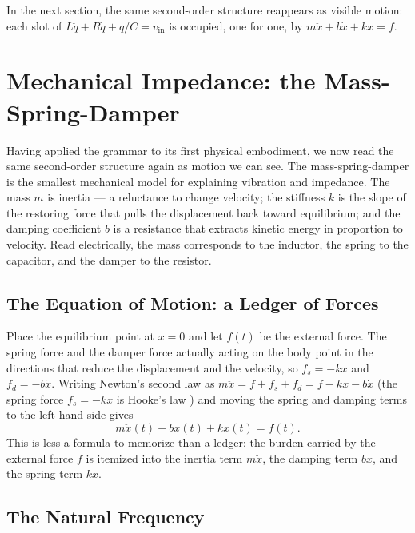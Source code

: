 In the next section, the same second-order structure reappears as visible
motion: each slot of
$L\ddot{q} + R\dot{q} + q/C = v_{\mathrm{in}}$
is occupied, one for one, by
$m\ddot{x} + b\dot{x} + kx = f$.

\section{Mechanical Impedance: the Mass-Spring-Damper}
\label{sec:u5-mechanical}

Having applied the grammar to its first physical embodiment, we now read
the same second-order structure again as motion we can see.
The mass-spring-damper is the smallest mechanical model for explaining
vibration and impedance.
The mass $m$ is inertia --- a reluctance to change velocity; the stiffness
$k$ is the slope of the restoring force that pulls the displacement back
toward equilibrium; and the damping coefficient $b$ is a resistance that
extracts kinetic energy in proportion to velocity.
Read electrically, the mass corresponds to the inductor, the spring to the
capacitor, and the damper to the resistor.

\subsection{The Equation of Motion: a Ledger of Forces}

Place the equilibrium point at $x=0$ and let $f(t)$ be the external force.
The spring force and the damper force actually acting on the body point in
the directions that reduce the displacement and the velocity, so
$f_s=-kx$ and $f_d=-b\dot{x}$.
Writing Newton's second law \cite{newton1687principia} as
$m\ddot{x}=f+f_s+f_d=f-kx-b\dot{x}$ (the spring force $f_s=-kx$ is
Hooke's law \cite{hooke1678depotentiarestitutiva}) and moving the spring
and damping terms to the left-hand side gives
\begin{equation}
  m\ddot{x}(t)+b\dot{x}(t)+kx(t)=f(t).
  \label{eq:u5m-msd}
\end{equation}
This is less a formula to memorize than a ledger: the burden carried by
the external force $f$ is itemized into the inertia term $m\ddot{x}$, the
damping term $b\dot{x}$, and the spring term $kx$.

\subsection{The Natural Frequency}


